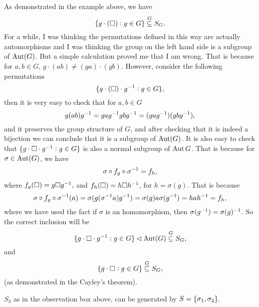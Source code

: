 \begin{observation}
	 \begin{example}
	 	As demonstrated in the example above, we have
	 	\[ \{g\cdot(\square): g\in G\} \overset{G}{\subseteq} S_G. \]
	 	For a while, I was thinking the permutations defined in this way are actually automorphisms and I was thinking the group on the left hand side is a subgroup of $ \operatorname{Aut}(G) $. But a simple calculation proved me that I am wrong. That is because for $ a,b \in G $, $ g\cdot(ab) \neq (ga)\cdot(gb) $. However, consider the following permutations
	 	\[ \{g\cdot(\square)\cdot g^{-1}: g\in G\}, \]
	 	then it is very easy to check that for $ a,b\in G $
	 	\[  g(ab)g^{-1} = gag^{-1} g b g^{-1} = (gag^{-1})(gbg^{-1}),  \]
	 	and it preserves the group structure of $ G $, and after checking that it is indeed a bijection we can conclude that it is a subgroup of $ \operatorname{Aut}(G) $. It is also easy to check that $ \{g\cdot\square\cdot g^{-1}: g\in G\} $ is also a normal subgroup of $ \operatorname{Aut}{G} $. That is because for $ \sigma \in \operatorname{Aut}(G) $, we have
	 	\[ \sigma\circ f_g \circ \sigma^{-1} = f_h, \]
	 	where $ f_g(\square) = g\square g^{-1}, $ and $ f_h(\square) = h\square h^{-1} $, for $ h = \sigma(g) $. That is because
	 	\[  \sigma\circ f_g \circ \sigma^{-1}(a) = \sigma(g(\sigma^{-1}a)g^{-1}) = \sigma(g) a \sigma(g^{-1}) = hah^{-1} = f_h, \]
	 	where we have used the fact if $ \sigma $ is an homomorphism, then $ \sigma(g^{-1}) = \sigma(g)^{-1} $.
	 	So the correct inclusion will be
	 	\[ \{g\cdot\square\cdot g^{-1}: g\in G\} \lhd \operatorname{Aut}(G) \overset{G}{\subseteq} S_G, \]
	 	and
	 	\[ \{g\cdot\square: g\in G\} \overset{G}{\subseteq} S_G, \]
	 	(as demonstrated in the Cayley's theorem).
	 \end{example}
\end{observation}
\begin{example}
	$ S_3 $ as in the observation box above, can be generated by $ S = \{\sigma_1, \sigma_2\} $. 
\end{example}



